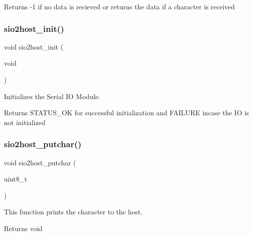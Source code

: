 \begin{DoxyReturn}{Returns}
\textquotesingle{}-\/1\textquotesingle{} if no data is recieved or returns the data if a character is received 
\end{DoxyReturn}
\mbox{\label{group__group__sio2host__uart_ga6d7d78548e59b7991d13d5a1fa3c5440}} 
\subsubsection{\texorpdfstring{sio2host\_init()}{sio2host\_init()}}
{\footnotesize\ttfamily void sio2host\+\_\+init (\begin{DoxyParamCaption}\item[{void}]{ }\end{DoxyParamCaption})}



Initializes the Serial IO Module. 

\begin{DoxyReturn}{Returns}
S\+T\+A\+T\+U\+S\+\_\+\+OK for successful initialization and F\+A\+I\+L\+U\+RE incase the IO is not initialized 
\end{DoxyReturn}
\mbox{\label{group__group__sio2host__uart_gabb543e29f8fd3f02734f54838811f91e}} 
\subsubsection{\texorpdfstring{sio2host\_putchar()}{sio2host\_putchar()}}
{\footnotesize\ttfamily void sio2host\+\_\+putchar (\begin{DoxyParamCaption}\item[{uint8\+\_\+t}]{ }\end{DoxyParamCaption})}



This function prints the character to the host. 

\begin{DoxyReturn}{Returns}
void 
\end{DoxyReturn}
\mbox{\label{group__group__sio2host__uart_ga627cf2cfc75197c5c927315bdf1b6449}} 
